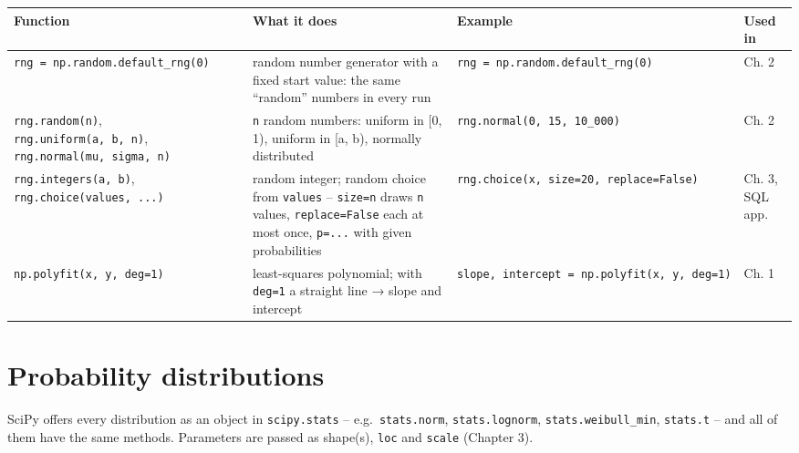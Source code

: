 \documentclass[
  letterpaper,
  DIV=11,
  numbers=noendperiod]{scrreprt}
\begin{document}
\begin{longtable}[]{@{}
  >{\raggedright\arraybackslash}p{}
  >{\raggedright\arraybackslash}p{}
  >{\raggedright\arraybackslash}p{}
  >{\raggedright\arraybackslash}p{}@{}}
\toprule\noalign{}
\begin{minipage}[b]{\linewidth}\raggedright
Function
\end{minipage} & \begin{minipage}[b]{\linewidth}\raggedright
What it does
\end{minipage} & \begin{minipage}[b]{\linewidth}\raggedright
Example
\end{minipage} & \begin{minipage}[b]{\linewidth}\raggedright
Used in
\end{minipage} \\
\midrule\noalign{}
\endhead
\bottomrule\noalign{}
\endlastfoot
\texttt{rng\ =\ np.random.default\_rng(0)} & random number generator
with a fixed start value: the same ``random'' numbers in every run &
\texttt{rng\ =\ np.random.default\_rng(0)} & Ch. 2 \\
\texttt{rng.random(n)}, \texttt{rng.uniform(a,\ b,\ n)},
\texttt{rng.normal(mu,\ sigma,\ n)} & \texttt{n} random numbers: uniform
in {[}0, 1), uniform in {[}a, b), normally distributed &
\texttt{rng.normal(0,\ 15,\ 10\_000)} & Ch. 2 \\
\texttt{rng.integers(a,\ b)}, \texttt{rng.choice(values,\ ...)} & random
integer; random choice from \texttt{values} -- \texttt{size=n} draws
\texttt{n} values, \texttt{replace=False} each at most once,
\texttt{p=...} with given probabilities &
\texttt{rng.choice(x,\ size=20,\ replace=False)} & Ch. 3, SQL app. \\
\texttt{np.polyfit(x,\ y,\ deg=1)} & least-squares polynomial; with
\texttt{deg=1} a straight line → slope and intercept &
\texttt{slope,\ intercept\ =\ np.polyfit(x,\ y,\ deg=1)} & Ch. 1 \\
\end{longtable}

\section{Probability distributions}\label{probability-distributions}

SciPy offers every distribution as an object in \texttt{scipy.stats} --
e.g.~\texttt{stats.norm}, \texttt{stats.lognorm},
\texttt{stats.weibull\_min}, \texttt{stats.t} -- and all of them have
the same methods. Parameters are passed as shape(s), \texttt{loc} and
\texttt{scale} (Chapter 3).
\end{document}
